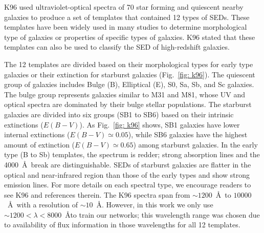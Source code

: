     K96 used ultraviolet-optical spectra of 70 star forming and quiescent nearby galaxies to produce a set of templates that contained 12 types of SEDs.
    These templates have been widely used in many studies to determine morphological type of galaxies or properties of specific types of galaxies\citep[e.g.][]{Shakouri16,Paiano16,Laporte16,Holden16}.
    K96 stated that these templates can also be used to classify the SED of high-redshift galaxies. 
    
    The 12 templates are divided based on their morphological types for early type galaxies or their extinction for starburst galaxies (Fig.~\ref{fig: k96}). 
    The quiescent group of galaxies includes Bulge (B), Elliptical (E), S0, Sa, Sb, and Sc galaxies.
    The bulge group represents galaxies similar to M31 and M81, whose UV and optical spectra are dominated by their bulge stellar populations.
    The starburst galaxies are divided into six groups (SB1 to SB6) based on their intrinsic extinctions ($E(B-V)$). 
    As Fig.~\ref{fig: k96} shows, SB1 galaxies have lower internal extinctions ($E(B-V) \simeq 0.05$), while SB6 galaxies have the highest amount of extinction ($E(B-V) \simeq 0.65$) among starburst galaxies. 
   In the early type (B to Sb) templates, the spectrum is redder; strong absorption lines and the 4000~\AA~break are distinguishable.
    SEDs of starburst galaxies are flatter in the optical and near-infrared region than those of the early types and show strong emission lines.
    For more details on each spectral type, we encourage readers to see K96 and references therein. 
   The K96 spectra span from $\sim1200$~\AA~to $10000$~\AA~with a resolution of $\sim 10$~\AA.
    However, in this work we only use $\sim1200< \lambda < 8000$~\AA to train our networks; 
    this wavelength range was chosen due to availability of flux information in those wavelengths for all 12 templates. 


